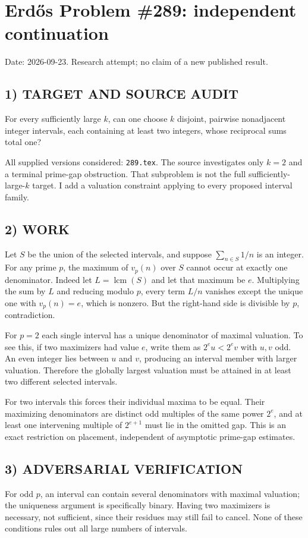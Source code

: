 \section{Erd\H{o}s Problem \#289: independent continuation}
\noindent Date: 2026-09-23. Research attempt; no claim of a new published result.
\subsection{1) TARGET AND SOURCE AUDIT}
For every sufficiently large $k$, can one choose $k$ disjoint, pairwise nonadjacent integer intervals, each containing at least two integers, whose reciprocal sums total one?

All supplied versions considered: \texttt{289.tex}.
The source investigates only $k=2$ and a terminal prime-gap obstruction. That subproblem is not the full sufficiently-large-$k$ target. I add a valuation constraint applying to every proposed interval family.
\subsection{2) WORK}
Let $S$ be the union of the selected intervals, and suppose $\sum_{n\in S}1/n$ is an integer. For any prime $p$, the maximum of $v_p(n)$ over $S$ cannot occur at exactly one denominator. Indeed let $L=\operatorname{lcm}(S)$ and let that maximum be $e$. Multiplying the sum by $L$ and reducing modulo $p$, every term $L/n$ vanishes except the unique one with $v_p(n)=e$, which is nonzero. But the right-hand side is divisible by $p$, contradiction.

For $p=2$ each single interval has a unique denominator of maximal valuation. To see this, if two maximizers had value $e$, write them as $2^e u<2^e v$ with $u,v$ odd. An even integer lies between $u$ and $v$, producing an interval member with larger valuation. Therefore the globally largest valuation must be attained in at least two different selected intervals.

For two intervals this forces their individual maxima to be equal. Their maximizing denominators are distinct odd multiples of the same power $2^e$, and at least one intervening multiple of $2^{e+1}$ must lie in the omitted gap. This is an exact restriction on placement, independent of asymptotic prime-gap estimates.
\subsection{3) ADVERSARIAL VERIFICATION}
For odd $p$, an interval can contain several denominators with maximal valuation; the uniqueness argument is specifically binary. Having two maximizers is necessary, not sufficient, since their residues may still fail to cancel. None of these conditions rules out all large numbers of intervals.
